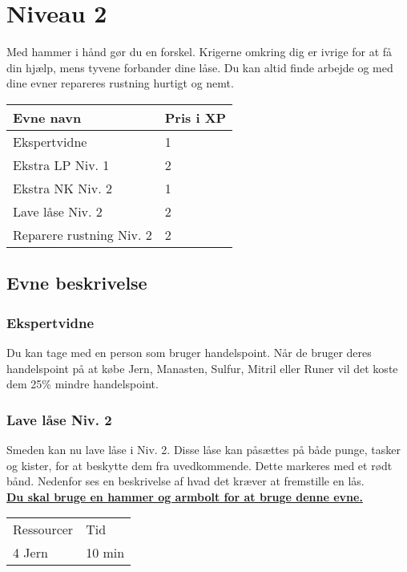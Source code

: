 \chapter{Niveau 2}
Med hammer i hånd gør du en forskel. Krigerne omkring dig er ivrige for at få din hjælp, mens tyvene forbander dine låse. Du kan altid finde arbejde og med dine evner repareres rustning hurtigt og nemt.
\begin{table}[H]
    \centering
    \begin{tabular}{|p{}|p{}|}
    \rowcolor{cerulean!80}\hline
    Evne navn & Pris i XP \\\hline
    Ekspertvidne & 1 \\\hline
    Ekstra LP Niv. 1 & 2\\\hline
    Ekstra NK Niv. 2 & 1\\\hline
    Lave låse Niv. 2 & 2\\\hline
    Reparere rustning Niv. 2 & 2\\\hline
    \end{tabular}
\end{table}
\section{Evne beskrivelse}

\subsection{Ekspertvidne}
Du kan tage med en person som bruger handelspoint. Når de bruger deres handelspoint på at købe Jern, Manasten, Sulfur, Mitril eller Runer vil det koste dem 25\% mindre handelspoint.





\subsection{Lave låse Niv. 2}
Smeden kan nu lave låse i Niv. 2. Disse låse kan påsættes på både punge, tasker og kister, for at beskytte dem fra uvedkommende. Dette markeres med et rødt bånd. Nedenfor ses en beskrivelse af hvad det kræver at fremstille en lås.\\
\textbf{\underline{Du skal bruge en hammer og armbolt for at bruge denne evne.}}\\

\begin{table}[H]
    \centering
    \begin{tabular}{|p{}|p{}|}
    \hline
    \rowcolor{cerulean!80}
    \multicolumn{2}{c}{Lås Niv. 2}\\
    \hline
    \rowcolor{cerulean!40}
         Ressourcer & Tid \\\hline
         4 Jern & 10 min\\\hline
    \end{tabular}
    \end{table}
    
